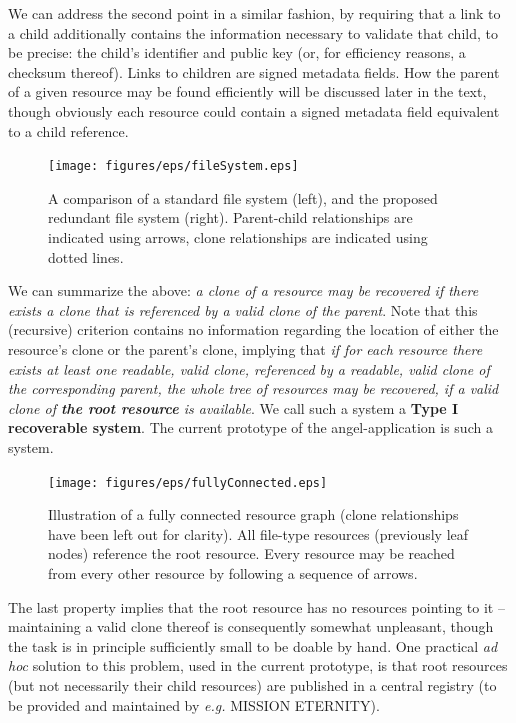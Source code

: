 \documentclass[11pt]{article}
\begin{document}
\begin{mainmatter}
We can address the second point in a similar fashion, by requiring that a link to a child additionally contains the information necessary to validate that child, to be precise: the child's identifier and public key (or, for efficiency reasons, a checksum thereof). Links to children are signed metadata fields. How the parent of a given resource may be found efficiently will be discussed later in the text, though obviously each resource could contain a signed metadata field equivalent to a child reference.

\begin{figure}[ht!]
\texttt{[image: figures/eps/fileSystem.eps]}
\caption{
A comparison of a standard file system (left), and the proposed redundant file system (right). Parent-child relationships are indicated using arrows, clone relationships are indicated using dotted lines.
}
\end{figure}

We can summarize the above: \emph{a clone of a resource may be recovered if there exists a clone that is referenced by a valid clone of the parent}. Note that this (recursive) criterion contains no information regarding the location of either the resource's clone or the parent's clone, implying that \emph{if for each resource there exists at least one readable, valid clone, referenced by a readable, valid clone of the corresponding parent, the whole tree of resources may be recovered, if a valid clone of \textbf{the root resource} is available}. We call such a system a\label{typeOne} \textbf{Type I recoverable system}. The current prototype of the angel-application is such a system.

\begin{figure}[ht!]
\texttt{[image: figures/eps/fullyConnected.eps]}
\caption{
Illustration of a fully connected resource graph (clone relationships have been left out for clarity). All file-type resources (previously leaf nodes) reference the root resource. Every resource may be reached from every other resource by following a sequence of arrows.
}
\end{figure}

 The last property implies that the root resource has no resources pointing to it -- maintaining a valid clone thereof is consequently somewhat unpleasant, though the task is in principle sufficiently small to be doable by hand. One practical \emph{ad hoc} solution to this problem, used in the current prototype, is that root resources (but not necessarily their child resources) are published in a central registry (to be provided and maintained by \emph{e.g.} MISSION ETERNITY). 


\end{mainmatter}
\end{document}
